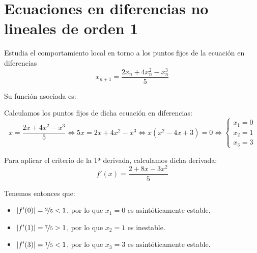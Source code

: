 \section{Ecuaciones en diferencias no lineales de orden 1}

\begin{ejercicio}
    Estudia el comportamiento local en torno a los puntos fijos de la ecuación en diferencias
    \begin{equation*}
        x_{n+1} = \frac{2x_n+4x_n^2-x_n^3}{5}
    \end{equation*}

    Su función asociada es:

    Calculamos los puntos fijos de dicha ecuación en diferencias:
    \begin{equation*}
        x=\dfrac{2x+4x^2-x^3}{5}
        \Longleftrightarrow
        5x = 2x+4x^2-x^3 
        \Longleftrightarrow
        x(x^2-4x+3)=0
        \Longleftrightarrow
        \left\{
        \begin{array}{l}
            x_1=0\\
            x_2=1\\
            x_3=3
        \end{array}
        \right.
    \end{equation*}

    Para aplicar el criterio de la 1ª derivada,
    calculamos dicha derivada:
    \begin{equation*}
        f'(x) = \dfrac{2+8x-3x^2}{5}
    \end{equation*}

    Tenemos entonces que:
    \begin{itemize}
        \item $|f'(0)|=\nicefrac{2}{5}<1$, por lo que $x_1=0$ es asintóticamente estable.
        \item $|f'(1)|=\nicefrac{7}{5}>1$, por lo que $x_2=1$ es inestable.
        \item $|f'(3)|=\nicefrac{1}{5}<1$, por lo que $x_3=3$ es asintóticamente estable.
    \end{itemize}
\end{ejercicio}

